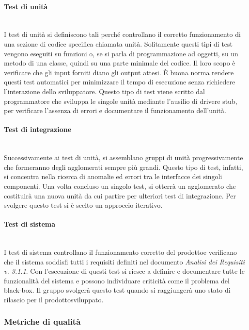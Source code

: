 \paragraph*{Test di unità} \mbox{}\\ [1mm]
I test di unità si definiscono tali perché controllano il corretto funzionamento di una sezione di codice specifica chiamata unità. Solitamente questi tipi di test vengono eseguiti su funzioni o, se si parla di programmazione ad oggetti, su un metodo di una classe, quindi su una parte minimale del codice. Il loro scopo è verificare che gli input forniti diano gli output attesi. È buona norma rendere questi test automatici per minimizzare il tempo di esecuzione senza richiedere l'interazione dello sviluppatore. Questo tipo di test viene scritto dal programmatore che sviluppa le singole unità mediante l'ausilio di driver\glosp e stub\glo, per verificare l'assenza di errori e documentare il funzionamento dell'unità.

\paragraph*{Test di integrazione} \mbox{}\\ [1mm]
Successivamente ai test di unità, si assemblano gruppi di unità progressivamente che formeranno degli agglomerati sempre più grandi. Questo tipo di test, infatti, si concentra nella ricerca di anomalie ed errori tra le interfacce dei singoli componenti. Una volta concluso un singolo test, si otterrà un agglomerato che costituirà una nuova unità da cui partire per ulteriori test di integrazione. Per svolgere questo test si è scelto un approccio iterativo.

\paragraph*{Test di sistema} \mbox{}\\ [1mm]
I test di sistema controllano il funzionamento corretto del prodotto\glosp e verificano che il sistema soddisfi tutti i requisiti definiti nel documento \textit{Analisi dei Requisiti v. 3.1.1}. Con l'esecuzione di questi test si riesce a definire e documentare tutte le funzionalità del sistema e possono individuare criticità come il problema del black-box\glo. Il gruppo svolgerà questo test quando si raggiungerà uno stato di rilascio per il prodotto\glosp sviluppato.

\subsubsection{Metriche di qualità}
